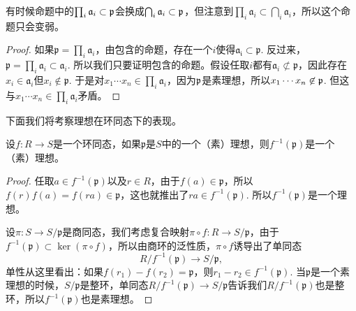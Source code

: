 有时候命题中的$\prod_i \mathfrak{a}_i\subset \mathfrak{p}$会换成$\bigcap_i \mathfrak{a}_i\subset \mathfrak{p}$，但注意到$\prod_i \mathfrak{a}_i\subset \bigcap_i \mathfrak{a}_i$，所以这个命题只会变弱。

\begin{proof}
	如果$\mathfrak{p}=\prod_i \mathfrak{a}_i$，由包含的命题，存在一个$i$使得$\mathfrak{a_i}\subset \mathfrak{p}$. 反过来，$\mathfrak{p}=\prod_i \mathfrak{a}_i\subset \mathfrak{a}_i$. 所以我们只要证明包含的命题。假设任取$i$都有$\mathfrak{a}_i\not\subset \mathfrak{p}$，因此存在$x_i\in\mathfrak{a}_i$但$x_i\not\in \mathfrak{p}$. 于是对$x_1\cdots x_n\in \prod_i \mathfrak{a}_i$，因为$\mathfrak{p}$是素理想，所以$x_1\cdots x_n\not\in \mathfrak{p}$. 但这与$x_1\cdots x_n\in \prod_i \mathfrak{a}_i$矛盾。
\end{proof}


下面我们将考察理想在环同态下的表现。

\begin{pro}
设$f:R\to S$是一个环同态，如果$\mathfrak{p}$是$S$中的一个（素）理想，则$f^{-1}(\mathfrak{p})$是一个（素）理想。
\end{pro}

\begin{proof}
	任取$a\in f^{-1}(\mathfrak{p})$以及$r\in R$，由于$f(a)\in \mathfrak{p}$，所以$f(r)f(a)=f(ra)\in \mathfrak{p}$，这也就推出了$ra\in f^{-1}(\mathfrak{p})$. 所以$f^{-1}(\mathfrak{p})$是一个理想。

	设$\pi:S\to S/\mathfrak{p}$是商同态，我们考虑复合映射$\pi\circ f:R\to S/\mathfrak{p}$，由于$f^{-1}(\mathfrak{p})\subset \ker(\pi\circ f)$，所以由商环的泛性质，$\pi\circ f$诱导出了单同态\[R/f^{-1}(\mathfrak{p})\to S/\mathfrak{p},\]
	单性从这里看出：如果$f(r_1)-f(r_2)=\mathfrak{p}$，则$r_1-r_2\in f^{-1}(\mathfrak{p})$. 当$\mathfrak{p}$是一个素理想的时候，$S/\mathfrak{p}$是整环，单同态$R/f^{-1}(\mathfrak{p})\to S/\mathfrak{p}$告诉我们$R/f^{-1}(\mathfrak{p})$也是整环，所以$f^{-1}(\mathfrak{p})$也是素理想。
\end{proof}

